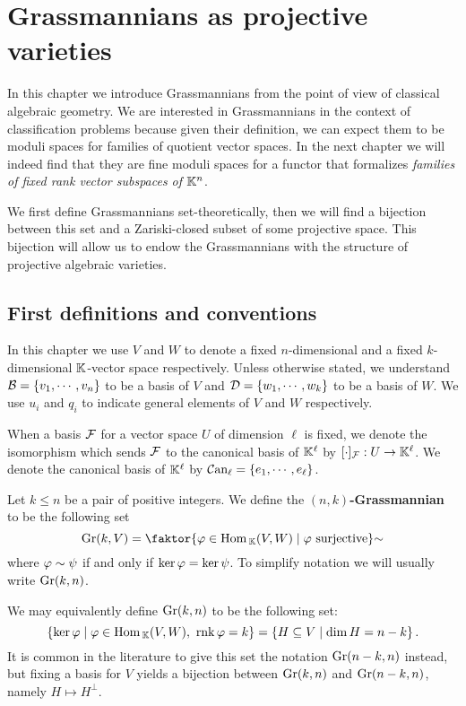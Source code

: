 \chapter{Grassmannians as projective varieties}
In this chapter we introduce Grassmannians from the point of view of classical algebraic geometry. We are interested in Grassmannians in the context of classification problems because given their definition, we can expect them to be moduli spaces for families of quotient vector spaces. In the next chapter we will indeed find that they are fine moduli spaces for a functor that formalizes \textit{families of fixed rank vector subspaces of $\mathbb{K}^n$}.

We first define Grassmannians set-theoretically, then we will find a bijection between this set and a Zariski-closed subset of some projective space. This bijection will allow us to endow the Grassmannians with the structure of projective algebraic varieties.

\section{First definitions and conventions}
\begin{notation}
In this chapter we use $V$ and $W$ to denote a fixed $n$-dimensional and a fixed $k$-dimensional $\mathbb{K}$-vector space respectively. 
Unless otherwise stated, we understand $\mathcal{B}=\left\{{v_1,\cdots, v_n}\right\}$ to be a basis of $V$ and $\mathcal{D}=\left\{{w_1,\cdots, w_k}\right\}$ to be a basis of $W$. We use $u_i$ and $q_i$ to indicate general elements of $V$ and $W$ respectively.

When a basis $\mathcal{F}$ for a vector space $U$ of dimension $\ell$ is fixed, we denote the isomorphism which sends $\mathcal{F}$ to the canonical basis of $\mathbb{K}^\ell$ by $[\cdot]_{\mathcal{F}}:U\to \mathbb{K}^\ell$. We denote the canonical basis of $\mathbb{K}^\ell$ by ${\mathcal{C}\mathrm{an}}_\ell=\left\{{e_1,\cdots, e_\ell}\right\}$.
\end{notation}

\begin{definition}[Grassmannian]
Let $k\leq n$ be a pair of positive integers. We define the \textbf{$(n,k)$-Grassmannian} to be the following set
\[\Gr(k,V)=\quot{\cpa{\vp\in\Hom_\K(V,W)\mid \vp\text{ surjective}}}\sim\]
where $\varphi\sim \psi$ if and only if $\ker \varphi=\ker \psi$. To simplify notation we will usually write $\mathrm{Gr}(k,n)$.
\end{definition}

\begin{remark}
We may equivalently define $\mathrm{Gr}(k,n)$ to be the following set:
\[\left\{{\ker \varphi\mid \varphi\in \mathrm{Hom}\,_{\mathbb{K}}(V,W),\ \mathrm{rnk}\, \varphi=k}\right\}=\left\{{H\subseteq V\mid \dim H=n-k}\right\}.\]
It is common in the literature to give this set the notation $\mathrm{Gr}(n-k,n)$ instead, but fixing a basis for $V$ yields a bijection between $\mathrm{Gr}(k,n)$ and $\mathrm{Gr}(n-k,n)$, namely $H\mapsto H^\perp$.
\end{remark}

